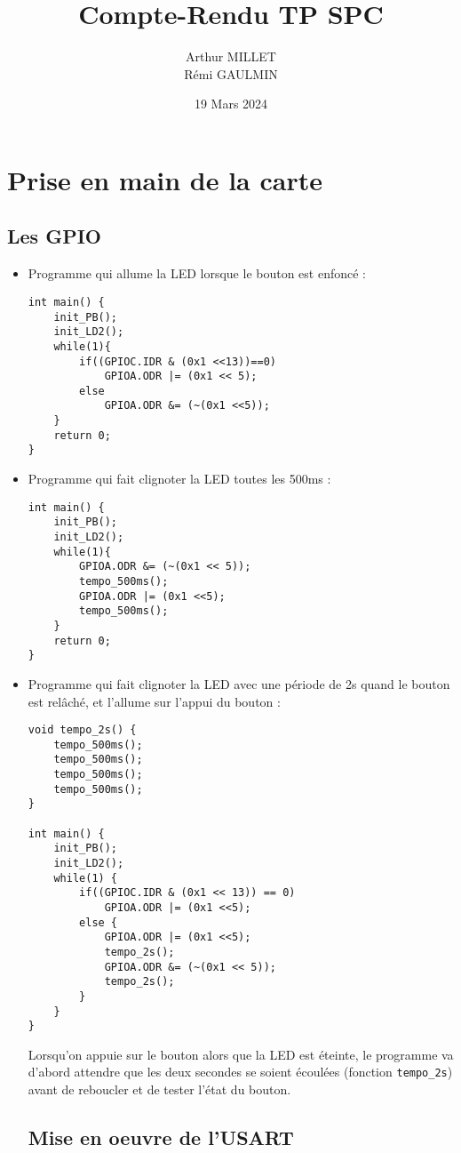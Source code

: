 \documentclass[10pt,a4,french]{article}
\title{Compte-Rendu TP SPC}
\author{Arthur MILLET\\ Rémi GAULMIN}
\date{19 Mars 2024}
\begin{document}
\lstset{language=C, frame=single}

\maketitle

\section{Prise en main de la carte}

\subsection{Les GPIO}

\begin{itemize}
	\item Programme qui allume la LED lorsque le bouton est enfoncé :
		\begin{lstlisting}
int main() {
	init_PB();
	init_LD2();
	while(1){
		if((GPIOC.IDR & (0x1 <<13))==0)
			GPIOA.ODR |= (0x1 << 5);
		else
			GPIOA.ODR &= (~(0x1 <<5));
	}
	return 0;
}
		\end{lstlisting}
	\item Programme qui fait clignoter la LED toutes les 500ms :
		\begin{lstlisting}
int main() {
	init_PB();
	init_LD2();
	while(1){
		GPIOA.ODR &= (~(0x1 << 5));
		tempo_500ms();
		GPIOA.ODR |= (0x1 <<5);
		tempo_500ms();
	}
	return 0;
}
		\end{lstlisting}
	\item Programme qui fait clignoter la LED avec une période de 2s quand le bouton est relâché, et l'allume sur l'appui du bouton :
		\begin{lstlisting}
void tempo_2s() {
	tempo_500ms();
	tempo_500ms();
	tempo_500ms();
	tempo_500ms();
}

int main() {
	init_PB();
	init_LD2();
	while(1) {
		if((GPIOC.IDR & (0x1 << 13)) == 0)
			GPIOA.ODR |= (0x1 <<5);
		else {
			GPIOA.ODR |= (0x1 <<5);
			tempo_2s();
			GPIOA.ODR &= (~(0x1 << 5));
			tempo_2s();
		}
	}
}
		\end{lstlisting}
		Lorsqu'on appuie sur le bouton alors que la LED est éteinte, le programme va d'abord attendre que les deux secondes se soient écoulées (fonction \texttt{tempo\_2s}) avant de reboucler et de tester l'état du bouton.

\subsection{Mise en oeuvre de l'USART}


\end{itemize}
\end{document}
